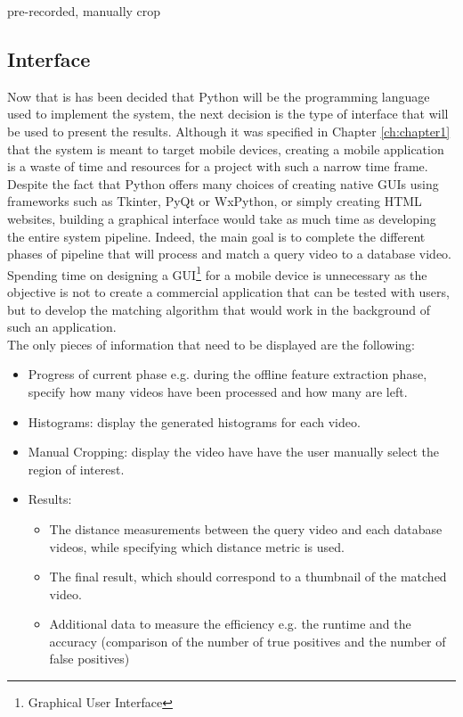 pre-recorded, manually crop

\subsection{Interface}

Now that is has been decided that Python will be the programming language used to implement the system, the next decision is the type of interface that will be used to present the results. Although it was specified in Chapter \ref{ch:chapter1} that the system is meant to target mobile devices, creating a mobile application is a waste of time and resources for a project with such a narrow time frame. Despite the fact that Python offers many choices of creating native GUIs using frameworks such as Tkinter, PyQt or WxPython, or simply creating HTML websites, building a graphical interface would take as much time as developing the entire system pipeline. Indeed, the main goal is to complete the different phases of pipeline that will process and match a query video to a database video. Spending time on designing a GUI\footnote{Graphical User Interface} for a mobile device is unnecessary as the objective is not to create a commercial application that can be tested with users, but to develop the matching algorithm that would work in the background of such an application.\\

The only pieces of information that need to be displayed are the following:
\begin{itemize}
    \item Progress of current phase e.g. during the offline feature extraction phase, specify how many videos have been processed and how many are left.
    \item Histograms: display the generated histograms for each video.
    \item Manual Cropping: display the video have have the user manually select the region of interest.
    \item Results:
    \begin{itemize}
        \item The distance measurements between the query video and each database videos, while specifying which distance metric is used.
        \item The final result, which should correspond to a thumbnail of the matched video.
        \item Additional data to measure the efficiency e.g. the runtime and the accuracy (comparison of the number of true positives and the number of false positives)
    \end{itemize}
\end{itemize}

